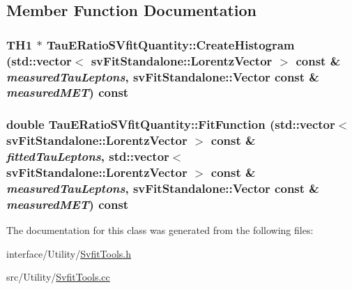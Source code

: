 \subsection{Member Function Documentation}
\hypertarget{classTauERatioSVfitQuantity_a5d010fd581144c6a95873899d7b8acec}{
\subsubsection[{CreateHistogram}]{\setlength{\rightskip}{0pt plus 5cm}TH1 $\ast$ TauERatioSVfitQuantity::CreateHistogram (std::vector$<$ svFitStandalone::LorentzVector $>$ const \& {\em measuredTauLeptons}, \/  svFitStandalone::Vector const \& {\em measuredMET}) const}}
\label{classTauERatioSVfitQuantity_a5d010fd581144c6a95873899d7b8acec}
\hypertarget{classTauERatioSVfitQuantity_a48e2918f090e27418f90f683a0f4c9db}{
\subsubsection[{FitFunction}]{\setlength{\rightskip}{0pt plus 5cm}double TauERatioSVfitQuantity::FitFunction (std::vector$<$ svFitStandalone::LorentzVector $>$ const \& {\em fittedTauLeptons}, \/  std::vector$<$ svFitStandalone::LorentzVector $>$ const \& {\em measuredTauLeptons}, \/  svFitStandalone::Vector const \& {\em measuredMET}) const}}
\label{classTauERatioSVfitQuantity_a48e2918f090e27418f90f683a0f4c9db}


The documentation for this class was generated from the following files:\begin{DoxyCompactItemize}
\item 
interface/Utility/\hyperlink{SvfitTools_8h}{SvfitTools.h}\item 
src/Utility/\hyperlink{SvfitTools_8cc}{SvfitTools.cc}\end{DoxyCompactItemize}
